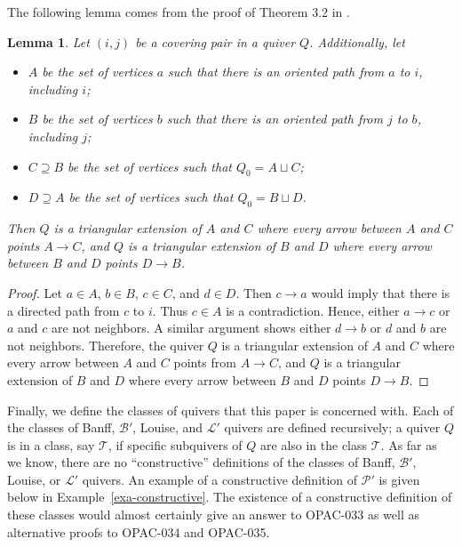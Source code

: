 \documentclass[10pt]{amsart}
\newtheorem{lemm}[thm]{Lemma}
\theoremstyle{definition}
\theoremstyle{remark}
\newcommand{\BB}{\mathcal{B}}
\newcommand{\PP}{\mathcal{P}}
\newcommand{\LL}{\mathcal{L}}
\begin{document}
The following lemma comes from the proof of Theorem 3.2 in \cite{MR4108215}.

\begin{lemm} \label{lem-covering-pair-triangulation}
    Let $(i,j)$ be a covering pair in a quiver $Q$.
    Additionally, let
    \begin{itemize}
        \item $A$ be the set of vertices $a$ such that there is an oriented path from $a$ to $i$, including $i$;

        \item $B$ be the set of vertices $b$ such that there is an oriented path from $j$ to $b$, including $j$;

        \item $C \supseteq B$ be the set of vertices such that $Q_0 = A \sqcup C$;

        \item $D \supseteq A$ be the set of vertices such that $Q_0 = B \sqcup D$.
    \end{itemize} 
    Then $Q$ is a triangular extension of $A$ and $C$ where every arrow between $A$ and $C$ points $A \to C$, and $Q$ is a triangular extension of $B$ and $D$ where every arrow between $B$ and $D$ points $D \to B$.
\end{lemm}

\begin{proof}
    Let $a \in A$, $b \in B$, $c \in C$, and $d \in D$.
    Then $c \to a$ would imply that there is a directed path from $c$ to $i$.
    Thus $c \in A$ is a contradiction.
    Hence, either $a \to c$ or $a$ and $c$ are not neighbors.
    A similar argument shows either $d \to b$ or $d$ and $b$ are not neighbors.
    Therefore, the quiver $Q$ is a triangular extension of $A$ and $C$ where every arrow between $A$ and $C$ points from $A \to C$, and $Q$ is a triangular extension of $B$ and $D$ where every arrow between $B$ and $D$ points $D \to B$.
\end{proof}

Finally, we define the classes of quivers that this paper is concerned with.
Each of the classes of Banff, $\BB'$, Louise, and $\LL'$ quivers are defined recursively; a quiver $Q$ is in a class, say $\mathcal{T}$, if specific subquivers of $Q$ are also in the class $\mathcal{T}$.
As far as we know, there are no ``constructive'' definitions of the classes of Banff, $\BB'$, Louise, or $\LL'$ quivers. 
An example of a constructive definition of $\PP'$ is given below in Example~\ref{exa-constructive}.
The existence of a constructive definition of these classes would almost certainly give an answer to OPAC-033 as well as alternative proofs to OPAC-034 and OPAC-035.
\end{document}
